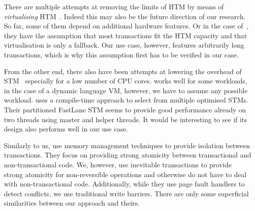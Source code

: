 \documentclass{sigplanconf}
\begin{document}
There are multiple attempts at removing the limits of HTM by means of
\emph{virtualising} HTM~\cite{rajwar05,chung06}. Indeed this may also
be the future direction of our research. So far, some of them depend
on additional hardware features. Or in the case of~\cite{chung06},
they have the assumption that most transactions fit the HTM capacity
and that virtualisation is only a fallback. Our use case, however,
features arbitrarily long transactions, which is why this assumption
first has to be verified in our case.

From the other end, there also have been attempts at lowering the
overhead of STM~\cite{warmhoff13,spear09} especially for a low number
of CPU cores. \cite{spear09} works well for some workloads, in the
case of a dynamic language VM, however, we have to assume any possible
workload.  \cite{warmhoff13} uses a compile-time approach to select
from multiple optimised STMs. Their partitioned FastLane STM seems to
provide good performance already on two threads using master and
helper threads. It would be interesting to see if its design also
performs well in our use case.

Similarly to us, \cite{martin09} use memory management techniques to
provide isolation between transactions. They focus on providing strong
atomicity between transactional and non-transactional code.  We,
however, use inevitable transactions to provide strong atomicity
for non-reversible operations and otherwise do not have to deal
with non-transactional code.  Additionally, while they use page fault
handlers to detect conflicts, we use traditional write barriers. There
are only some superficial similarities between our approach and
theirs.



\end{document}
